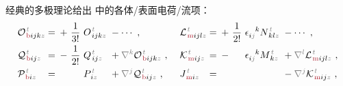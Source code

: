 经典的多极理论给出  中的各体/表面电荷/流项：
\begin{subequations}
\begin{align}
	&{\mathcal{O}}^{\;\!\mathcolor{gray}{t}}_{\;\!\textcolor{Maroon}{\text{b}} ijk \mathcolor{gray}{z}} \hspace{-1em}&&=\hspace{0.2em} +~ \frac{1}{3!}~ O^{\;\!\mathcolor{gray}{t}}_{\;\! ijk\mathcolor{gray}{z}} &&\hspace{-0.7em}- \cdots~, &&\hspace{0.3em} {\mathcal{L}}^{\;\!\mathcolor{gray}{t}}_{\;\!\textcolor{Maroon}{\text{m}} ijl \mathcolor{gray}{z}} \hspace{-1em}&&=\hspace{0.2em} +~ \frac{1}{2!}~ \epsilon^{\hphantom{ij}k}_{i\mathcolor{gray}{j}} N^{\;\!\mathcolor{gray}{t}}_{\;\! kl\mathcolor{gray}{z}} &&\hspace{-0.7em}- \cdots~, \label{eq:Ob-Lm} \\
	&{\mathcal{Q}}^{\;\!\mathcolor{gray}{t}}_{\;\!\textcolor{Maroon}{\text{b}} ij \mathcolor{gray}{z}} \hspace{-1em}&&=\hspace{0.2em} -~ \frac{1}{2!}~ Q^{\;\!\mathcolor{gray}{t}}_{\;\! ij\mathcolor{gray}{z}} &&\hspace{-0.7em}+ \mathcolor{gray}{\nabla^k} {\mathcal{O}}^{\;\!\mathcolor{gray}{t}}_{\;\!\textcolor{Maroon}{\text{b}} ijk \mathcolor{gray}{z}}~,  &&\hspace{0.3em} {\mathcal{K}}^{\;\!\mathcolor{gray}{t}}_{\;\!\textcolor{Maroon}{\text{m}} ij \mathcolor{gray}{z}} \hspace{-1em}&&=\hspace{0.2em} -~ \hphantom{\frac{1}{2!}}~ \epsilon^{\hphantom{ij}k}_{i\mathcolor{gray}{j}} M^{\;\!\mathcolor{gray}{t}}_{\;\! k\mathcolor{gray}{z}} &&\hspace{-0.7em}+ \mathcolor{gray}{\nabla^l} {\mathcal{L}}^{\;\!\mathcolor{gray}{t}}_{\;\!\textcolor{Maroon}{\text{m}} ijl \mathcolor{gray}{z}}~, \label{eq:Qb-Km} \\
	&{\mathcal{P}}^{\;\!\mathcolor{gray}{t}}_{\;\!\textcolor{Maroon}{\text{b}} i \mathcolor{gray}{z}} \hspace{-1em}&&=\hspace{0.2em} ~ \hphantom{+\frac{1}{2!}}~ P^{\;\!\mathcolor{gray}{t}}_{\;\! i\mathcolor{gray}{z}} &&\hspace{-0.7em}+ \mathcolor{gray}{\nabla^j} {\mathcal{Q}}^{\;\!\mathcolor{gray}{t}}_{\;\!\textcolor{Maroon}{\text{b}} ij \mathcolor{gray}{z}}~, &&\hspace{0.3em} {J}^{\;\!\mathcolor{gray}{t}}_{\;\!\textcolor{Maroon}{\text{m}} i \mathcolor{gray}{z}} \hspace{-1em}&&=\hspace{0.2em} &&\hspace{-0.7em}- \mathcolor{gray}{\nabla^j} {\mathcal{K}}^{\;\!\mathcolor{gray}{t}}_{\;\!\textcolor{Maroon}{\text{m}} ij \mathcolor{gray}{z}}~, \label{eq:Pb-Jm} \\

\end{align}
\end{subequations}
